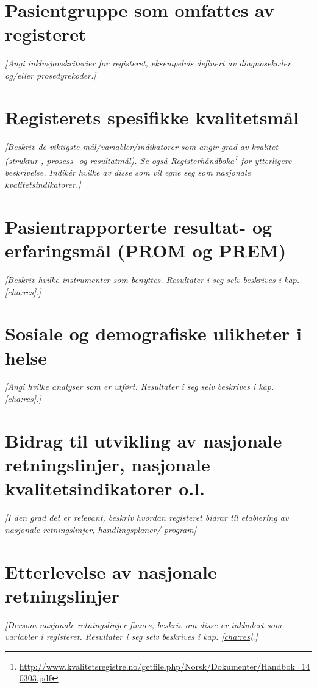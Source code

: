 \documentclass[norsk, a4paper, twocolumn]{report}
\newcommand{\guide}[1] {
	\textit{[\textcolor{guidegray}{#1}]}
	}
\begin{document}
\section{Pasientgruppe som omfattes av registeret}
\guide{Angi inklusjonskriterier for registeret, eksempelvis definert av
diagnosekoder og/eller prosedyrekoder.}

\section{Registerets spesifikke kvalitetsmål}\label{sec:regspe}
\guide{Beskriv de viktigste mål/variabler/indikatorer som angir grad av
kvalitet (struktur-, prosess- og resultatmål). Se også
\href{http://www.kvalitetsregistre.no/getfile.php/Norsk/Dokumenter/Handbok_140303.pdf}{Registerhåndboka}\footnote{\url{http://www.kvalitetsregistre.no/getfile.php/Norsk/Dokumenter/Handbok_140303.pdf}}
for ytterligere beskrivelse. Indikér hvilke av disse som vil egne seg som
nasjonale kvalitetsindikatorer.}

\section{Pasientrapporterte resultat- og erfaringsmål (PROM og PREM)}\label{sec:pasutk}
\guide{Beskriv hvilke instrumenter som benyttes. Resultater i seg selv
beskrives i kap. \ref{cha:res}.}

\section{Sosiale og demografiske ulikheter i helse}\label{sec:sosdem}
\guide{Angi hvilke analyser som er utført. Resultater i seg selv beskrives
i kap. \ref{cha:res}.}

\section{Bidrag til utvikling av nasjonale retningslinjer, nasjonale
kvalitetsindikatorer o.l.}\label{sec:retut}
\guide{I den grad det er relevant, beskriv hvordan registeret bidrar til
etablering av nasjonale retningslinjer, handlingsplaner/-program}

\section{Etterlevelse av nasjonale retningslinjer}\label{sec:retbru}
\guide{Dersom nasjonale retningslinjer finnes, beskriv om disse er inkludert
som variabler i registeret. Resultater i seg selv beskrives i kap.
\ref{cha:res}.}
\end{document}
